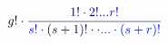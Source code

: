 \documentclass[12pt]{article}
\begin{document}
\makeatletter
\renewcommand*{\@textcolor}[3]{%
  \protect\leavevmode
  \begingroup
    \color#1{#2}#3%
  \endgroup
}
\makeatother
\begin{displaymath}
\mathcolor[RGB]{0,0,15}{g} \mathcolor[RGB]{0,0,30}{!} \mathcolor[RGB]{0,0,45}{\cdot} \mathcolor[RGB]{0,0,60}{\frac { \mathcolor[RGB]{0,0,75}{1} \mathcolor[RGB]{0,0,90}{!} \mathcolor[RGB]{0,0,105}{\cdot} \mathcolor[RGB]{0,0,120}{2} \mathcolor[RGB]{0,0,135}{!} \mathcolor[RGB]{0,0,150}{.} \mathcolor[RGB]{0,0,165}{.} \mathcolor[RGB]{0,0,180}{.} \mathcolor[RGB]{0,0,195}{r} \mathcolor[RGB]{0,0,210}{!} } { \mathcolor[RGB]{0,0,225}{s} \mathcolor[RGB]{0,0,240}{!} \mathcolor[RGB]{0,0,255}{\cdot} \mathcolor[RGB]{0,15,0}{(} \mathcolor[RGB]{0,15,15}{s} \mathcolor[RGB]{0,15,30}{+} \mathcolor[RGB]{0,15,45}{1} \mathcolor[RGB]{0,15,60}{)} \mathcolor[RGB]{0,15,75}{!} \mathcolor[RGB]{0,15,90}{\cdot} \mathcolor[RGB]{0,15,105}{\cdot} \mathcolor[RGB]{0,15,120}{.} \mathcolor[RGB]{0,15,135}{.} \mathcolor[RGB]{0,15,150}{.} \mathcolor[RGB]{0,15,165}{\cdot} \mathcolor[RGB]{0,15,180}{(} \mathcolor[RGB]{0,15,195}{s} \mathcolor[RGB]{0,15,210}{+} \mathcolor[RGB]{0,15,225}{r} \mathcolor[RGB]{0,15,240}{)} \mathcolor[RGB]{0,15,255}{!} } }
\end{displaymath}
\end{document}
